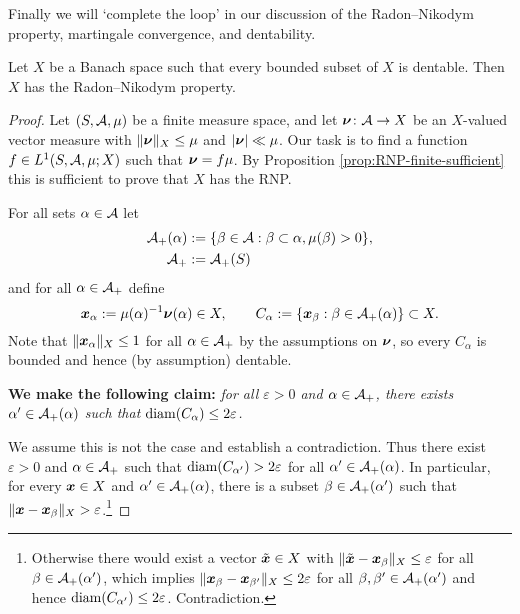 Finally we will `complete the loop' in our discussion of the Radon--Nikodym property, martingale convergence, and dentability.

\begin{thm}
  Let $X$ be a Banach space such that every bounded subset of $X$ is dentable.
  Then $X$ has the Radon--Nikodym property.
\end{thm}

\begin{proof}
  Let $(S,\mathcal{A},\mu)$ be a finite measure space, and let $\bm{\nu} \colon \mathcal{A} \rightarrow X$ be an $X$-valued vector measure with $\|\bm{\nu}\|_{X} \leq \mu$ and $|\bm{\nu}| \ll \mu$.
  Our task is to find a function $f \in L^1(S,\mathcal{A},\mu;X)$ such that $\bm{\nu} = f\mu$.
  By Proposition \ref{prop:RNP-finite-sufficient} this is sufficient to prove that $X$ has the RNP.

  For all sets $\alpha \in \mathcal{A}$ let
  \begin{equation*}
    \begin{aligned}
      \mathcal{A}_{+}(\alpha) &:= \{\beta \in \mathcal{A} : \beta \subset \alpha, \mu(\beta) > 0\}, \\
      \mathcal{A}_{+} &:= \mathcal{A}_{+}(S)
    \end{aligned}
  \end{equation*}
  and for all $\alpha \in \mathcal{A}_{+}$ define
  \begin{equation*}
    \bm{x}_{\alpha} := \mu(\alpha)^{-1} \bm{\nu}(\alpha)\in X, \qquad 
    C_{\alpha} := \{ \bm{x}_{\beta} : \beta \in \mathcal{A}_{+}(\alpha)\} \subset X.
  \end{equation*}
  Note that $\|\bm{x}_{\alpha}\|_X \leq 1$ for all $\alpha \in \mathcal{A}_{+}$ by the assumptions on $\bm{\nu}$, so every $C_{\alpha}$ is bounded and hence (by assumption) dentable.

  \textbf{We make the following claim:} \emph{for all $\varepsilon > 0$ and $\alpha \in \mathcal{A}_{+}$, there exists $\alpha' \in \mathcal{A}_+(\alpha)$ such that $\operatorname{diam}(C_{\alpha}) \leq 2\varepsilon$.}
  
  We assume this is not the case and establish a contradiction.
  Thus there exist $\varepsilon > 0$ and $\alpha \in \mathcal{A}_{+}$ such that $\operatorname{diam}(C_{\alpha'}) > 2\varepsilon$ for all $\alpha' \in \mathcal{A}_+(\alpha)$.
  In particular, for every $\bm{x} \in X$ and $\alpha' \in \mathcal{A}_{+}(\alpha)$, there is a subset $\beta \in \mathcal{A}_{+}(\alpha')$ such that $\|\bm{x} - \bm{x}_{\beta}\|_{X} > \varepsilon$.\footnote{Otherwise there would exist a vector $\tilde{\bm{x}} \in X$ with $\|\tilde{\bm{x}} - \bm{x}_{\beta}\|_{X} \leq \varepsilon$ for all $\beta \in \mathcal{A}_{+}(\alpha')$, which implies $\|\bm{x}_{\beta} - \bm{x}_{\beta'}\|_{X} \leq 2\varepsilon$ for all $\beta,\beta' \in \mathcal{A}_+(\alpha')$ and hence $\operatorname{diam}(C_{\alpha'}) \leq 2\varepsilon$. Contradiction.}
  

\end{proof}
